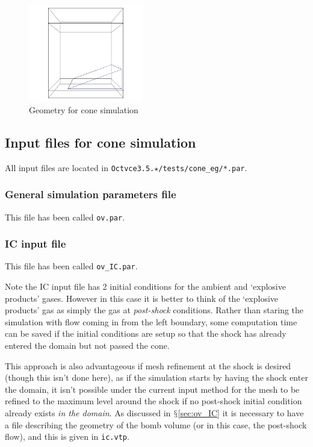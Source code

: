 \documentclass[pdftex, 12pt, a4paper]{report}
\begin{document}
\begin{figure}[htp]
\centering
\includegraphics[width=5cm]{pics/cone_eg/geom.jpg}
\caption{Geometry for cone simulation}
\label{fig:cone_geomfig}
\end{figure}

\subsection{Input files for cone simulation}\label{sec:cone_par}

All input files are located in \verb'Octvce3.5.'$\star$\verb'/tests/cone_eg/*.par'.  

\subsubsection{General simulation parameters file}

This file has been called \verb'ov.par'.

\subsubsection{IC input file}

This file has been called \verb'ov_IC.par'.

Note the IC input file has 2 initial conditions for the ambient and `explosive products' gases.
However in this case it is better to think of the `explosive products' gas as simply the gas at \emph{post-shock} conditions.  Rather
than staring the simulation with flow coming in from the left boundary, some computation time can be saved if the initial conditions
are setup so that the shock has already entered the domain but not passed the cone.  

This approach is also advantageous if mesh refinement at the shock is desired (though this isn't done here), as if
the simulation starts by having the shock enter the domain, it isn't possible under the current input method for the mesh to be 
refined to the maximum level around the shock if no post-shock initial condition already exists \emph{in the domain}.  
As discussed in $\mathsection$\ref{sec:ov_IC} it is necessary to have a file describing the geometry of the bomb volume (or in this
case, the post-shock flow), and this is given in \verb'ic.vtp'.
\end{document}
